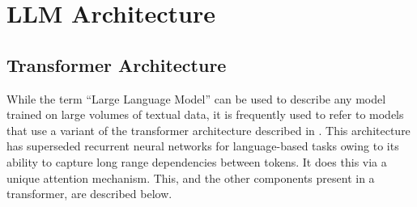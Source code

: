 \documentclass[12pt,twoside]{report}
\begin{document}
\section{LLM Architecture}\label{section:llmarchitecture}
\subsection{Transformer Architecture}
While the term ``Large Language Model'' can be used to describe any model trained on large volumes of textual data, it is frequently used to refer to models that use a variant of the transformer architecture described in \cite{vaswani2017attention}.
This architecture has superseded recurrent neural networks for language-based tasks owing to its ability to capture long range dependencies between tokens.
It does this via a unique attention mechanism.
This, and the other components present in a transformer, are described below.
\end{document}

